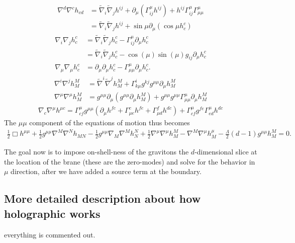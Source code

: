 \begin{align}
\nabla^d \nabla^c h_{cd} &= \tilde \nabla_i \tilde \nabla_j h^{ij} + \partial_\mu(\Gamma^\mu_{ij} h^{ij}) + h^{ij} \Gamma^\mu_{ij} \Gamma^\mu_{\mu\mu} \\
&= \tilde \nabla_i \tilde \nabla_j h^{ij} + \sin \mu \partial_\mu (\cos \mu  h^c_c)
\end{align}
\begin{align}
\nabla_i \nabla_j h^c_c &= \tilde \nabla_i \tilde \nabla_j h^c_c - \Gamma^\mu_{ij} \partial_\mu h^c_c\\
&=\tilde \nabla_i \tilde \nabla_j h^c_c - \cos(\mu)\sin(\mu) g_{ij} \partial_\mu h^c_c\\
\nabla_\mu \nabla_\mu h^{c}_c &= \partial_\mu \partial_\mu h^c_c - \Gamma^\mu_{\mu\mu} \partial_\mu h^c_c.
\end{align}
\begin{align}
\nabla^i \nabla^j h^M_M &= \tilde \nabla^i \tilde \nabla^j h^M_M + \Gamma^i_{k\mu} g^{kj} g^{\mu\mu} \partial_\mu h^M_M\\
\nabla^\mu \nabla^\mu h^{M}_M &= g^{\mu\mu} \partial_\mu(g^{\mu\mu} \partial_\mu h^M_M) + g^{\mu\mu}g^{\mu\mu} \Gamma^\mu_{\mu\mu} \partial_\mu h^M_M
\end{align}
\begin{align}
\nabla_c \nabla^\mu h^{\mu c} = \Gamma^\mu_{cf} g^{\mu\mu} (\partial_\mu h^{fc} + \Gamma^c_{\mu e} h^{fe} + \Gamma^f_{\mu d} h^{dc}) + \Gamma^\mu_{cf} g^{fe} \Gamma^\mu_{ed} h^{dc}
\end{align}
The $\mu\mu$ component of the equations of motion thus becomes
\begin{align}
\frac 1 2 \Box h^{\mu\mu} + \frac 1 2 g^{\mu\mu} \nabla^M \nabla^N h_{MN} - \frac 1 2 g^{\mu\mu} \nabla_M \nabla^M h^N_N + \frac 1 2 \nabla^\mu \nabla^\mu h^M_M - \nabla^M \nabla^\mu h^\mu_M - \frac{\Lambda}{2}(d-1) g^{\mu\mu} h^M_M = 0. 
\end{align}

The goal now is to impose on-shell-ness of the gravitons the $d$-dimensional slice at the location of the brane (these are the zero-modes) and solve for the behavior in $\mu$ direction, after we have added a source term at the boundary.

\subsection{More detailed description about how holographic works}
everything is commented out.

